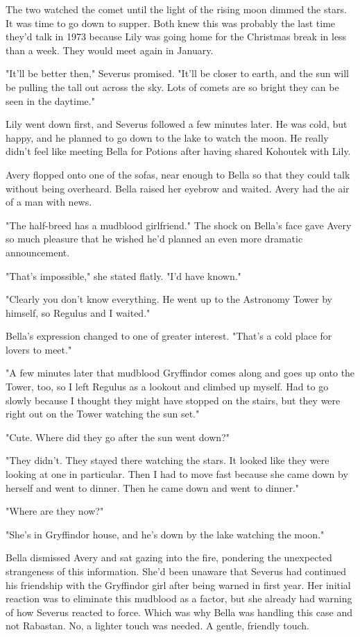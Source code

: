 \documentclass[a4paper,11pt]{article}
\begin{document}
The two watched the comet until the light of the rising moon dimmed the stars. It was time to go down to supper. Both knew this was probably the last time they'd talk in 1973 because Lily was going home for the Christmas break in less than a week. They would meet again in January.

"It'll be better then," Severus promised. "It'll be closer to earth, and the sun will be pulling the tall out across the sky. Lots of comets are so bright they can be seen in the daytime."

Lily went down first, and Severus followed a few minutes later. He was cold, but happy, and he planned to go down to the lake to watch the moon. He really didn't feel like meeting Bella for Potions after having shared Kohoutek with Lily.

Avery flopped onto one of the sofas, near enough to Bella so that they could talk without being overheard. Bella raised her eyebrow and waited. Avery had the air of a man with news.

"The half-breed has a mudblood girlfriend." The shock on Bella's face gave Avery so much pleasure that he wished he'd planned an even more dramatic announcement.

"That's impossible," she stated flatly. "I'd have known."

"Clearly you don't know everything. He went up to the Astronomy Tower by himself, so Regulus and I waited."

Bella's expression changed to one of greater interest. "That's a cold place for lovers to meet."

"A few minutes later that mudblood Gryffindor comes along and goes up onto the Tower, too, so I left Regulus as a lookout and climbed up myself. Had to go slowly because I thought they might have stopped on the stairs, but they were right out on the Tower watching the sun set."

"Cute. Where did they go after the sun went down?"

"They didn't. They stayed there watching the stars. It looked like they were looking at one in particular. Then I had to move fast because she came down by herself and went to dinner. Then he came down and went to dinner."

"Where are they now?"

"She's in Gryffindor house, and he's down by the lake watching the moon."

Bella dismissed Avery and sat gazing into the fire, pondering the unexpected strangeness of this information. She'd been unaware that Severus had continued his friendship with the Gryffindor girl after being warned in first year. Her initial reaction was to eliminate this mudblood as a factor, but she already had warning of how Severus reacted to force. Which was why Bella was handling this case and not Rabastan. No, a lighter touch was needed. A gentle, friendly touch.
\end{document}
